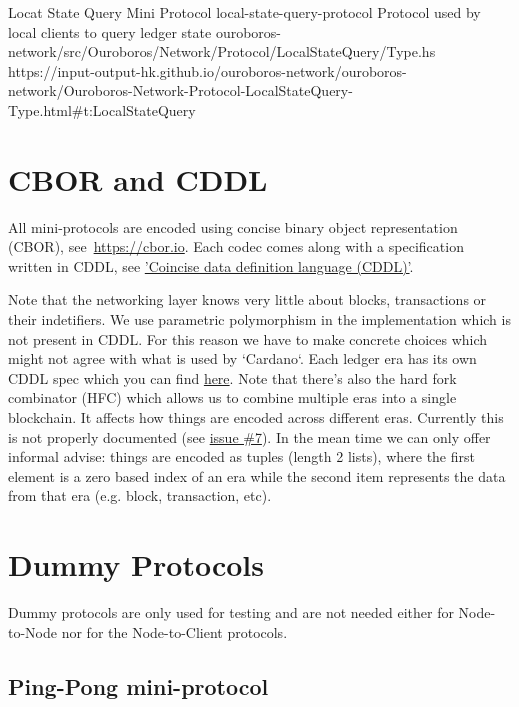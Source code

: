 \miniEntry
    {Locat State Query Mini Protocol}
    {local-state-query-protocol}
    {Protocol used by local clients to query ledger state}
    {ouroboros-network/src/Ouroboros/Network/Protocol/LocalStateQuery/Type.hs}
    {https://input-output-hk.github.io/ouroboros-network/ouroboros-network/Ouroboros-Network-Protocol-LocalStateQuery-Type.html\#t:LocalStateQuery}

\section{CBOR and CDDL}
All mini-protocols are encoded using concise binary object representation
(CBOR), see~\url{https://cbor.io}.  Each codec comes along with a specification
written in CDDL,
see \href{https://cbor-wg.github.io/cddl/draft-ietf-cbor-cddl.html}{'Coincise
data definition language (CDDL)'}.

Note that the networking layer knows very little about blocks, transactions or
their indetifiers.  We use parametric polymorphism in the implementation which
is not present in CDDL.  For this reason we have to make concrete choices which
might not agree with what is used by `Cardano`.  Each ledger era has its own
CDDL spec which you can find
\href{https://github.com/input-output-hk/cardano-ledger#cardano-ledger}{here}.
Note that there's also the hard fork combinator (HFC) which allows us to
combine multiple eras into a single blockchain.  It affects how things are
encoded across different eras.  Currently this is not properly documented (see
\href{https://github.com/input-output-hk/ouroboros-consensus/issues/7}{issue
\#7}). In the mean time we can only offer informal advise: things are encoded as
tuples (length 2 lists), where the first element is a zero based index of an
era while the second item represents the data from that era (e.g. block,
transaction, etc).

\section{Dummy Protocols}
Dummy protocols are only used for testing and are not needed either for
Node-to-Node nor for the Node-to-Client protocols.
\subsection{Ping-Pong mini-protocol}
\label{ping-pong-protocol}
\newcommand{\Ping}{\msg{MsgPing}}
\newcommand{\Pong}{\msg{MsgPong}}


